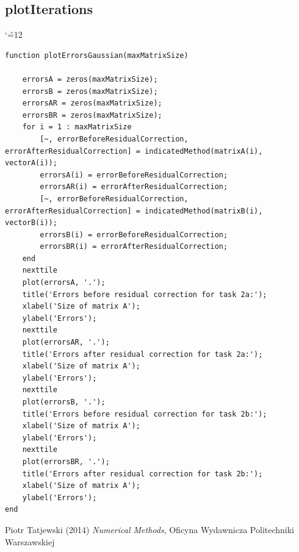 \documentclass[12pt]{report}
\newenvironment{simplechar}{%
   \catcode`\^=12
}{}
\begin{document}
\subsection{plotIterations}
\begin{simplechar}
\begin{lstlisting}
function plotErrorsGaussian(maxMatrixSize)

    errorsA = zeros(maxMatrixSize);
    errorsB = zeros(maxMatrixSize);
    errorsAR = zeros(maxMatrixSize);
    errorsBR = zeros(maxMatrixSize);
    for i = 1 : maxMatrixSize
        [~, errorBeforeResidualCorrection, errorAfterResidualCorrection] = indicatedMethod(matrixA(i), vectorA(i));
        errorsA(i) = errorBeforeResidualCorrection;
        errorsAR(i) = errorAfterResidualCorrection;
        [~, errorBeforeResidualCorrection, errorAfterResidualCorrection] = indicatedMethod(matrixB(i), vectorB(i));
        errorsB(i) = errorBeforeResidualCorrection;
        errorsBR(i) = errorAfterResidualCorrection;
    end
    nexttile
    plot(errorsA, '.');
    title('Errors before residual correction for task 2a:');
    xlabel('Size of matrix A');
    ylabel('Errors');
    nexttile
    plot(errorsAR, '.');
    title('Errors after residual correction for task 2a:');
    xlabel('Size of matrix A');
    ylabel('Errors');
    nexttile
    plot(errorsB, '.');
    title('Errors before residual correction for task 2b:');
    xlabel('Size of matrix A');
    ylabel('Errors');
    nexttile
    plot(errorsBR, '.');
    title('Errors after residual correction for task 2b:');
    xlabel('Size of matrix A');
    ylabel('Errors');
end
\end{lstlisting}
\end{simplechar}

\begin{thebibliography}{9}
Piotr Tatjewski (2014) \emph{Numerical Methods}, Oficyna Wydawnicza Politechniki Warszawskiej
\end{thebibliography}
\end{document}
